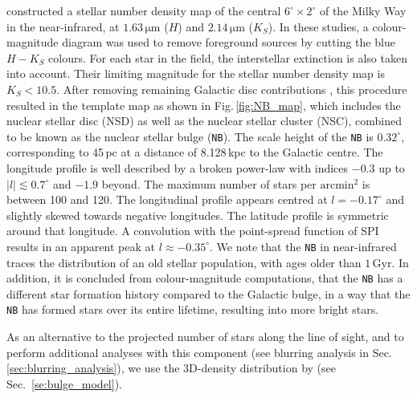 \documentclass[doublespace,nopageskip]{VTthesis} %
\newcommand{\mrm}[1]{\mathrm{#1}}
\begin{document}
\citet{Nishiyama2013_NuclearBulge_PlasmaMagnet} constructed a stellar number density map of the central $6^{\circ} \times 2^{\circ}$ of the Milky Way in the near-infrared, at $1.63\,\mrm{\mu m}$ ($H$) and $2.14\,\mrm{\mu m}$ ($K_S$).
%
In these studies, a colour-magnitude diagram was used to remove foreground sources by cutting the blue $H-K_S$ colours.
%
For each star in the field, the interstellar extinction is also taken into account.
%
Their limiting magnitude for the stellar number density map is $K_S<10.5$.
%
After removing remaining Galactic disc contributions \citep{Macias2018_LATGeV}, this procedure resulted in the template map as shown in Fig.\,\ref{fig:NB_map}, which includes the nuclear stellar disc (NSD) as well as the nuclear stellar cluster (NSC), combined to be known as the nuclear stellar bulge (\texttt{NB}).
%
The scale height of the \texttt{NB} is $0.32^{\circ}$, corresponding to 45\,pc at a distance of 8.128\,kpc to the Galactic centre.
%
The longitude profile is well described by a broken power-law with indices $-0.3$ up to $|l| \lesssim 0.7^{\circ}$ and $-1.9$ beyond.
%
The maximum number of stars per $\mrm{arcmin^2}$ is between 100 and 120.
%
The longitudinal profile appears centred at $l=-0.17^{\circ}$ and slightly skewed towards negative longitudes.
%
The latitude profile is symmetric around that longitude.
%
A convolution with the point-spread function of SPI results in an apparent peak at $l \approx -0.35^{\circ}$.
%
We note that the \texttt{NB} in near-infrared traces the distribution of an old stellar population, with ages older than $1\,\mrm{Gyr}$.
%
In addition, it is concluded from colour-magnitude computations, that the \texttt{NB} has a different star formation history compared to the Galactic bulge, in a way that the \texttt{NB} has formed stars over its entire lifetime, resulting into more bright stars.

As an alternative to the projected number of stars along the line of sight, and to perform additional analyses with this component (see blurring analysis in Sec.\,\ref{sec:blurring_analysis}), we use the 3D-density distribution by \citet{Launhardt2002_NB} (see Sec.~\ref{se:bulge_model}).
%

\end{document}
